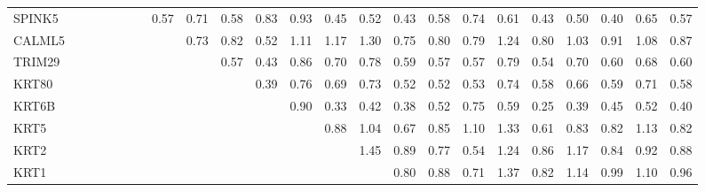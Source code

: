 \begin{longtable}{lrrrrrrrrrrrrrrrrrrrrrr}
SPINK5 &            &              &           &            &            &              &         0.57 &         0.71 &        0.58 &        0.83 &       0.93 &       0.45 &       0.52 &      0.43 &        0.58 &        0.74 &        0.61 &       0.43 &         0.50 &         0.40 &       0.65 &          0.57 \\
CALML5 &            &              &           &            &            &              &              &         0.73 &        0.82 &        0.52 &       1.11 &       1.17 &       1.30 &      0.75 &        0.80 &        0.79 &        1.24 &       0.80 &         1.03 &         0.91 &       1.08 &          0.87 \\
TRIM29 &            &              &           &            &            &              &              &              &        0.57 &        0.43 &       0.86 &       0.70 &       0.78 &      0.59 &        0.57 &        0.57 &        0.79 &       0.54 &         0.70 &         0.60 &       0.68 &          0.60 \\
KRT80  &            &              &           &            &            &              &              &              &             &        0.39 &       0.76 &       0.69 &       0.73 &      0.52 &        0.52 &        0.53 &        0.74 &       0.58 &         0.66 &         0.59 &       0.71 &          0.58 \\
KRT6B  &            &              &           &            &            &              &              &              &             &             &       0.90 &       0.33 &       0.42 &      0.38 &        0.52 &        0.75 &        0.59 &       0.25 &         0.39 &         0.45 &       0.52 &          0.40 \\
KRT5   &            &              &           &            &            &              &              &              &             &             &            &       0.88 &       1.04 &      0.67 &        0.85 &        1.10 &        1.33 &       0.61 &         0.83 &         0.82 &       1.13 &          0.82 \\
KRT2   &            &              &           &            &            &              &              &              &             &             &            &            &       1.45 &      0.89 &        0.77 &        0.54 &        1.24 &       0.86 &         1.17 &         0.84 &       0.92 &          0.88 \\
KRT1   &            &              &           &            &            &              &              &              &             &             &            &            &            &      0.80 &        0.88 &        0.71 &        1.37 &       0.82 &         1.14 &         0.99 &       1.10 &          0.96 \\

\end{longtable}
